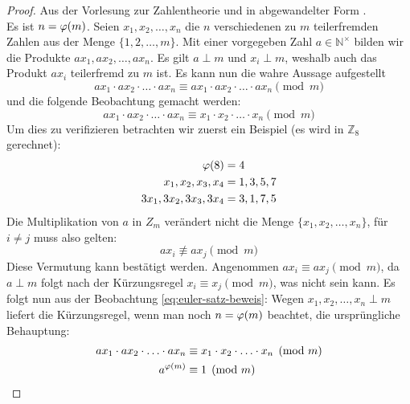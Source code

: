 \begin{proof}
  Aus der Vorlesung zur Zahlentheorie \parencite{SITE:phi-euler-fermat} und in
  abgewandelter Form \parencite[187-188]{BOOK:numberTheory}. \\
  Es ist $n = \varphi(m)$. Seien $x_1,x_2,\ldots,x_n$ die $n$ verschiedenen zu
  $m$ teilerfremden Zahlen aus der Menge $\{1,2,\ldots,m\}$. Mit einer vorgegeben Zahl
  $a \in \mathbb{N}^\times$ bilden wir die Produkte $ax_1,ax_2,\ldots,ax_n$.
  Es gilt $a \perp m$ und $x_i \perp m$, weshalb auch das Produkt $ax_i$ teilerfremd zu $m$ ist.
  Es kann nun die wahre Aussage aufgestellt
  \begin{equation*}
    ax_1 \cdot ax_2 \cdot \ldots \cdot ax_n \equiv
    ax_1 \cdot ax_2 \cdot \ldots \cdot ax_n \pmod{m}
  \end{equation*}
  und die folgende Beobachtung gemacht werden:
  \begin{equation*}
    \label{eq:euler-satz-beweis}
    ax_1 \cdot ax_2 \cdot \ldots \cdot ax_n \equiv
    x_1 \cdot x_2 \cdot \ldots \cdot x_n  \pmod{m} \tag{$\ast$}
  \end{equation*}
  Um dies zu verifizieren betrachten wir zuerst ein Beispiel (es wird in $\mathbb{Z}_8$ gerechnet):
  \begin{align*}
    \varphi(8)            & = 4       \\
    x_1,x_2,x_3,x_4     & = 1,3,5,7 \\
    3x_1,3x_2,3x_3,3x_4 & = 3,1,7,5
  \end{align*}
  Die Multiplikation von $a$ in $Z_m$ verändert nicht die Menge $\{x_1,x_2,\ldots,x_n\}$,
  für $i \neq j$ muss also gelten:
  \begin{equation*}
    ax_i \not\equiv ax_j \pmod{m}
  \end{equation*}
  Diese Vermutung kann bestätigt werden. Angenommen
  $ax_i \equiv ax_j \pmod{m}$, da $a \perp m$ folgt nach der Kürzungsregel
  $x_i \equiv x_j \pmod{m}$, was nicht sein kann.
  Es folgt nun aus der Beobachtung \eqref{eq:euler-satz-beweis}:
  Wegen $x_1,x_2,\ldots,x_n \perp m$ liefert die Kürzungsregel, wenn man noch
  $n = \varphi(m)$ beachtet, die ursprüngliche Behauptung:
  \begin{align*}
    ax_1 \cdot ax_2 \cdot \ldots \cdot ax_n & \equiv
    x_1 \cdot x_2 \cdot \ldots \cdot x_n  \pmod{m}              \\
    a^{\varphi(m)}                            & \equiv 1 \pmod{m}
  \end{align*}
\end{proof}


